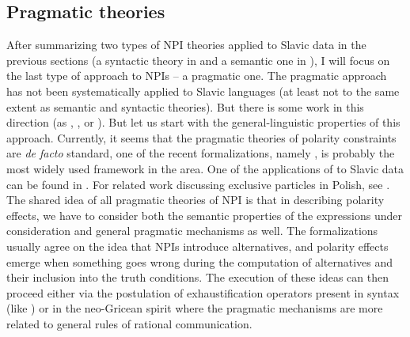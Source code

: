 \documentclass[output=paper,colorlinks,citecolor=brown]{langscibook}
\begin{document}
\newpage
\subsection{Pragmatic theories}\label{pragmatic-theories}

After summarizing two types of NPI theories applied to Slavic data in the previous sections (a syntactic theory in  and a semantic one in ), I will focus on the last type of approach to NPIs -- a pragmatic one. The pragmatic approach has not been systematically applied to Slavic languages (at least not to the same extent as semantic and syntactic theories). But there is some work in this direction (as \citealt{tomaszewicz2013az}, \citealt{gajic18,gajic_2022}, \citealt{docekaldotlacilsubedinb} or \citealt{DocekalSafratova2019}). But let us start with the general-linguistic properties of this approach. Currently, it seems that the pragmatic theories of polarity constraints are \textit{de facto} standard, one of the recent formalizations, namely \citet{Chierchia2013}, is probably the most widely used framework in the area. One of the applications of \citet{Chierchia2013} to Slavic data can be found in \citet{gajic18}. For related work discussing exclusive particles in Polish, see . The shared idea of all pragmatic theories of NPI is that in describing polarity effects, we have to consider both the semantic properties of the expressions under consideration and general pragmatic mechanisms as well. The formalizations usually agree on the idea that NPIs introduce alternatives, and polarity effects emerge when something goes wrong during the computation of alternatives and their inclusion into the truth conditions. The execution of these ideas can then proceed either via the postulation of exhaustification operators present in syntax (like \citealt{Chierchia2013}) or in the neo-Gricean spirit where the pragmatic mechanisms are more related to general rules of rational communication.
\end{document}

